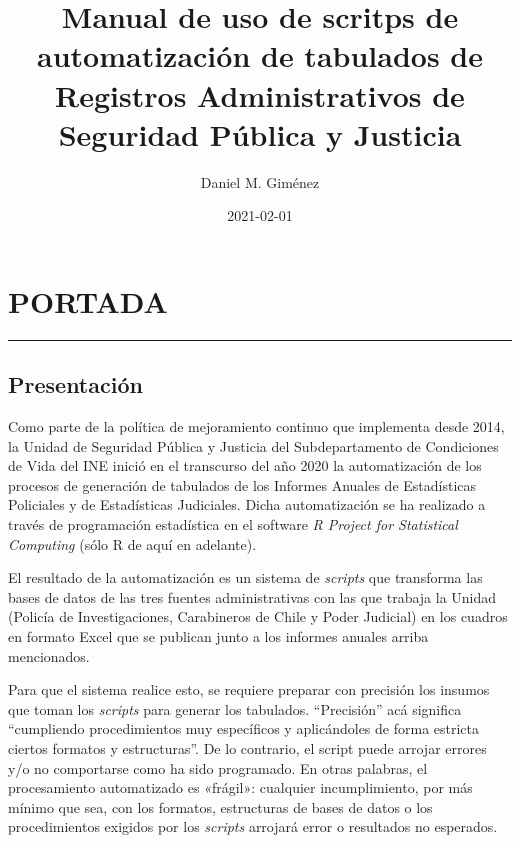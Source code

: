 \documentclass[
  spanish,
]{book}
\title{Manual de uso de scritps de automatización de tabulados de Registros Administrativos de Seguridad Pública y Justicia}
\author{Daniel M. Giménez}
\date{2021-02-01}
\begin{document}
\maketitle

{
\setcounter{tocdepth}{1}
\tableofcontents
}
\hypertarget{part-portada}{%
\part*{PORTADA}\label{part-portada}}

\begin{center}\rule{0.5\linewidth}{0.5pt}\end{center}

\hypertarget{presentaciuxf3n}{%
\chapter*{Presentación}\label{presentaciuxf3n}}

Como parte de la política de mejoramiento continuo que implementa desde 2014, la Unidad de Seguridad Pública y Justicia del Subdepartamento de Condiciones de Vida del INE inició en el transcurso del año 2020 la automatización de los procesos de generación de tabulados de los Informes Anuales de Estadísticas Policiales y de Estadísticas Judiciales. Dicha automatización se ha realizado a través de programación estadística en el software \emph{R Project for Statistical Computing} (sólo R de aquí en adelante).

El resultado de la automatización es un sistema de \emph{scripts} que transforma las bases de datos de las tres fuentes administrativas con las que trabaja la Unidad (Policía de Investigaciones, Carabineros de Chile y Poder Judicial) en los cuadros en formato Excel que se publican junto a los informes anuales arriba mencionados.

Para que el sistema realice esto, se requiere preparar con precisión los insumos que toman los \emph{scripts} para generar los tabulados. ``Precisión'' acá significa ``cumpliendo procedimientos muy específicos y aplicándoles de forma estricta ciertos formatos y estructuras''. De lo contrario, el script puede arrojar errores y/o no comportarse como ha sido programado. En otras palabras, el procesamiento automatizado es «frágil»: cualquier incumplimiento, por más mínimo que sea, con los formatos, estructuras de bases de datos o los procedimientos exigidos por los \emph{scripts} arrojará error o resultados no esperados.
\end{document}
